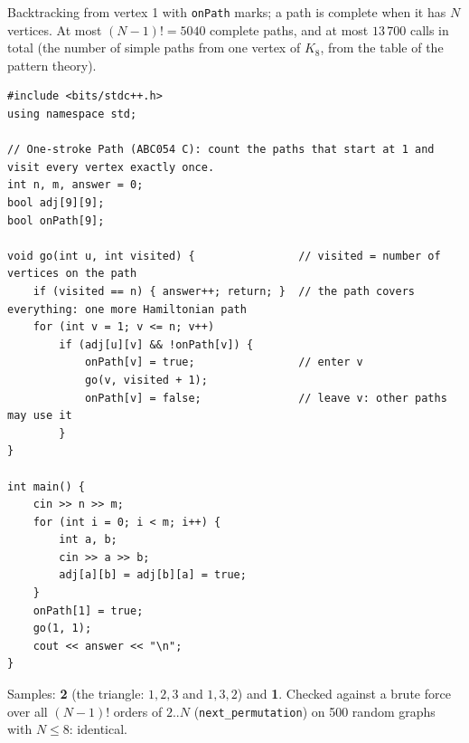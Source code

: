 \begin{solutionbox}
Backtracking from vertex 1 with \texttt{onPath} marks; a path is complete when it has $N$ vertices. At most $(N-1)! = 5040$ complete paths, and at most $13\,700$ calls in total (the number of simple paths from one vertex of $K_8$, from the table of the pattern theory).
\begin{center}
\end{center}
\begin{lstlisting}[style=cpp]
#include <bits/stdc++.h>
using namespace std;

// One-stroke Path (ABC054 C): count the paths that start at 1 and visit every vertex exactly once.
int n, m, answer = 0;
bool adj[9][9];
bool onPath[9];

void go(int u, int visited) {                // visited = number of vertices on the path
    if (visited == n) { answer++; return; }  // the path covers everything: one more Hamiltonian path
    for (int v = 1; v <= n; v++)
        if (adj[u][v] && !onPath[v]) {
            onPath[v] = true;                // enter v
            go(v, visited + 1);
            onPath[v] = false;               // leave v: other paths may use it
        }
}

int main() {
    cin >> n >> m;
    for (int i = 0; i < m; i++) {
        int a, b;
        cin >> a >> b;
        adj[a][b] = adj[b][a] = true;
    }
    onPath[1] = true;
    go(1, 1);
    cout << answer << "\n";
}
\end{lstlisting}
Samples: \textbf{2} (the triangle: $1,2,3$ and $1,3,2$) and \textbf{1}. Checked against a brute force over all $(N-1)!$ orders of $2..N$ (\texttt{next\_permutation}) on 500 random graphs with $N \le 8$: identical.
\end{solutionbox}

